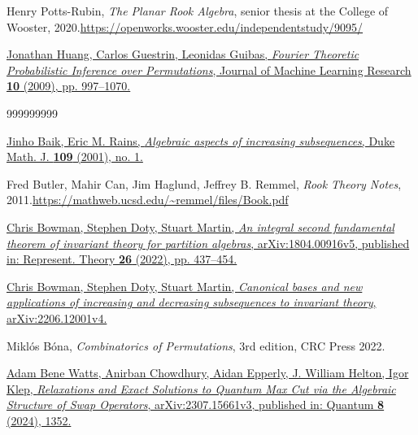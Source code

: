 \documentclass[numbers=enddot,12pt,final,onecolumn,notitlepage]{scrartcl}%
\numberwithin{exer}{subsection}
\theoremstyle{definition}
\newenvironment{noncompile}{}{}
\begin{document}
\bigskip

\begin{noncompile}
Henry Potts-Rubin, \textit{The Planar Rook Algebra}, senior thesis at the
College of Wooster, 2020.\newline\url{https://openworks.wooster.edu/independentstudy/9095/}
\end{noncompile}

\begin{noncompile}
\href{https://www.jmlr.org/papers/volume10/huang09a/huang09a.pdf}{Jonathan
Huang, Carlos Guestrin, Leonidas Guibas, \textit{Fourier Theoretic
Probabilistic Inference over Permutations}, Journal of Machine Learning
Research \textbf{10} (2009), pp. 997--1070.}
\end{noncompile}

\begin{thebibliography}{999999999}                                                                                        %


%
\href{https://doi.org/10.1215/S0012-7094-01-10911-3}{Jinho Baik, Eric M.
Rains, \textit{Algebraic aspects of increasing subsequences}, Duke Math. J.
\textbf{109} (2001), no. 1.}

Fred Butler, Mahir Can, Jim Haglund, Jeffrey B.
Remmel, \textit{Rook Theory Notes}, 2011.\newline\url{https://mathweb.ucsd.edu/~remmel/files/Book.pdf}

\href{https://doi.org/10.1090/ert/593}{Chris
Bowman, Stephen Doty, Stuart Martin, \textit{An integral second fundamental
theorem of invariant theory for partition algebras}, arXiv:1804.00916v5,
published in: Represent. Theory \textbf{26} (2022), pp. 437--454.}

\href{https://arxiv.org/abs/2206.12001v4}{Chris
Bowman, Stephen Doty, Stuart Martin, \textit{Canonical bases and new
applications of increasing and decreasing subsequences to invariant theory},
arXiv:2206.12001v4.}

Mikl\'{o}s B\'{o}na, \textit{Combinatorics of
Permutations}, 3rd edition, CRC Press 2022.

\href{https://arxiv.org/abs/2307.15661v3}{Adam Bene
Watts, Anirban Chowdhury, Aidan Epperly, J. William Helton, Igor Klep,
\textit{Relaxations and Exact Solutions to Quantum Max Cut via the Algebraic
Structure of Swap Operators}, arXiv:2307.15661v3, published in: Quantum
\textbf{8} (2024), 1352.}


\end{thebibliography}
\end{document}
